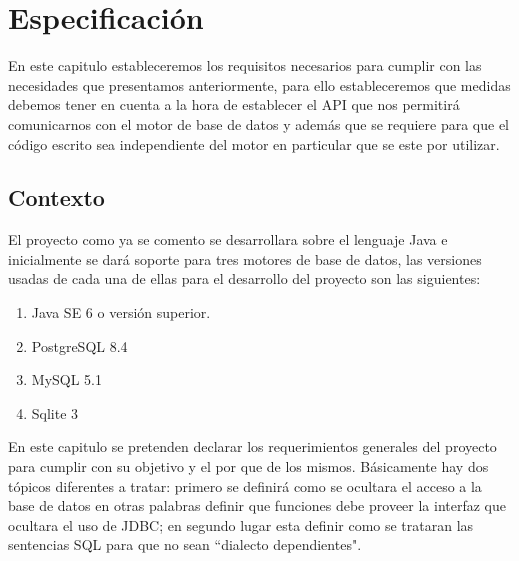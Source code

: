 \chapter{Especificación}
\label{capitulo:especificacion}
En este capitulo estableceremos los requisitos necesarios para cumplir con las necesidades que presentamos anteriormente, para ello estableceremos que medidas debemos tener en cuenta a la hora de establecer el API que nos permitirá comunicarnos con el motor de base de datos y además que se requiere para que el código escrito sea independiente del motor en particular que se este por utilizar.
%
%
\section{Contexto}
%
El proyecto como ya se comento se desarrollara sobre el lenguaje Java e inicialmente se dará soporte para tres motores de base de datos, las versiones usadas de cada una de ellas para el desarrollo del proyecto son las siguientes:
\begin{enumerate}
	\item Java SE 6 o versión superior.
	\item PostgreSQL 8.4
	\item MySQL 5.1
	\item Sqlite 3
\end{enumerate}
%
En este capitulo se pretenden declarar los requerimientos generales del proyecto para cumplir con su objetivo y el por que de los mismos. Básicamente hay dos tópicos diferentes a tratar: primero se definirá como se ocultara el acceso a la base de datos en otras palabras definir que funciones debe proveer la interfaz que ocultara el uso de JDBC; en segundo lugar esta definir como se trataran las sentencias SQL para que no sean ``dialecto dependientes".
%
